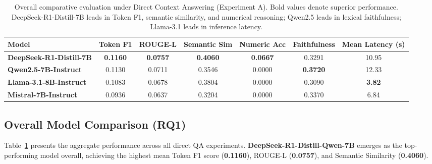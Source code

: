 \documentclass[11pt]{article}
\begin{document}
\begin{table}[t]
\centering
\small
\begin{tabular}{lcccccc}
\toprule
\textbf{Model} & \textbf{Token F1} & \textbf{ROUGE-L} & \textbf{Semantic Sim} & \textbf{Numeric Acc} & \textbf{Faithfulness} & \textbf{Mean Latency (s)} \\
\midrule
\textbf{DeepSeek-R1-Distill-7B} & \textbf{0.1160} & \textbf{0.0757} & \textbf{0.4060} & \textbf{0.0667} & 0.3291 & 10.95 \\
\textbf{Qwen2.5-7B-Instruct} & 0.1130 & 0.0711 & 0.3546 & 0.0000 & \textbf{0.3720} & 12.33 \\
\textbf{Llama-3.1-8B-Instruct} & 0.1083 & 0.0678 & 0.3804 & 0.0000 & 0.3090 & \textbf{3.82} \\
\textbf{Mistral-7B-Instruct} & 0.0936 & 0.0637 & 0.3204 & 0.0000 & 0.3370 & 6.84 \\
\bottomrule
\end{tabular}
\caption{Overall comparative evaluation under Direct Context Answering (Experiment A). Bold values denote superior performance. DeepSeek-R1-Distill-7B leads in Token F1, semantic similarity, and numerical reasoning; Qwen2.5 leads in lexical faithfulness; Llama-3.1 leads in inference latency.}
\label{tab:direct_results}
\end{table}

\begin{table}[h]
\centering
\small
{}
\caption{Dataset-specific Token F1 scores (Direct QA).}
\label{tab:dataset_breakdown}
\end{table}

\subsection{Overall Model Comparison (RQ1)}
Table~\ref{tab:direct_results} presents the aggregate performance across all direct QA experiments. \textbf{DeepSeek-R1-Distill-Qwen-7B} emerges as the top-performing model overall, achieving the highest mean Token F1 score (\textbf{0.1160}), ROUGE-L (\textbf{0.0757}), and Semantic Similarity (\textbf{0.4060}). 
\end{document}
